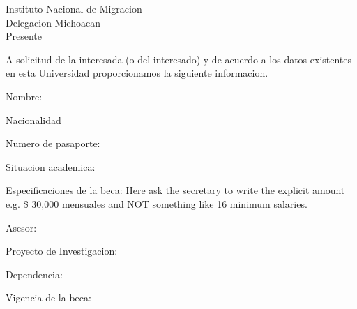 \documentclass[10pt]{article}
\begin{document}
\noindent
Instituto Nacional de Migracion \\
Delegacion Michoacan \\
Presente


\bigskip
\bigskip
\bigskip
\bigskip
\noindent
A solicitud de la interesada (o del interesado) y de acuerdo a los datos existentes en esta Universidad proporcionamos la siguiente informacion. 


\bigskip
\bigskip
\noindent
Nombre:


\bigskip
\bigskip
\noindent
Nacionalidad

\bigskip
\bigskip
\noindent
Numero de pasaporte:

\bigskip
\bigskip
\noindent
Situacion academica:


\bigskip
\bigskip
\noindent
Especificaciones de la beca:  Here ask the secretary to write the explicit amount e.g. \$ 30,000 mensuales and NOT something like 16 minimum salaries. 

\bigskip
\bigskip
\noindent
Asesor:

\bigskip
\bigskip
\noindent
Proyecto de Investigacion:

\bigskip
\bigskip
\noindent
Dependencia:


\bigskip
\bigskip
\noindent
Vigencia de la beca:
\end{document}

